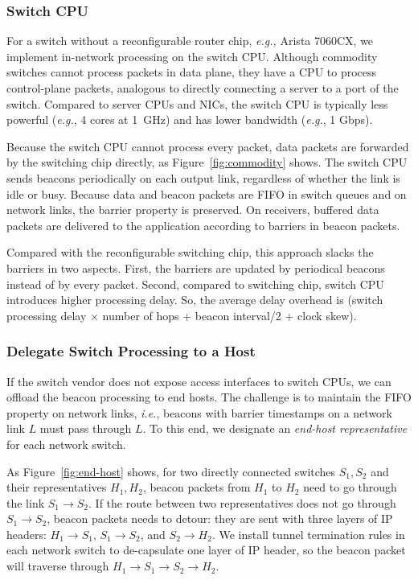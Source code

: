 \subsubsection{Switch CPU}
\label{sec:commodity}

For a switch without a reconfigurable router chip, \textit{e.g.,} Arista 7060CX, we implement in-network processing on the switch CPU.
Although commodity switches cannot process packets in data plane, they have a CPU to process control-plane packets, analogous to directly connecting a server to a port of the switch.
Compared to server CPUs and NICs, the switch CPU is typically less powerful (\textit{e.g.}, 4 cores at 1~GHz) and has lower bandwidth (\textit{e.g.}, 1 Gbps).

Because the switch CPU cannot process every packet, data packets are forwarded by the switching chip directly, as Figure~\ref{fig:commodity} shows.
The switch CPU sends beacons periodically on each output link, regardless of whether the link is idle or busy.
Because data and beacon packets are FIFO in switch queues and on network links, the barrier property is preserved. On receivers, buffered data packets are delivered to the application according to barriers in beacon packets.

Compared with the reconfigurable switching chip, this approach slacks the barriers in two aspects.
First, the barriers are updated by periodical beacons instead of by every packet.
Second, compared to switching chip, switch CPU introduces higher processing delay.
So, the average delay overhead is (switch processing delay $\times$ number of hops + beacon interval/2 + clock skew).

\subsubsection{Delegate Switch Processing to a Host}
\label{sec:end-host}

If the switch vendor does not expose access interfaces to switch CPUs, we can offload the beacon processing to end hosts. The challenge is to maintain the FIFO property on network links, \emph{i.e.}, beacons with barrier timestamps on a network link $L$ must pass through $L$. To this end, we designate an \emph{end-host representative} for each network switch. %

As Figure~\ref{fig:end-host} shows, for two directly connected switches $S_1, S_2$ and their representatives $H_1, H_2$, beacon packets from $H_1$ to $H_2$ need to go through the link $S_1 \rightarrow S_2$. If the route between two representatives does not go through $S_1 \rightarrow S_2$, beacon packets needs to detour: they are sent with three layers of IP headers: $H_1 \rightarrow S_1$, $S_1 \rightarrow S_2$, and $S_2 \rightarrow H_2$.
We install tunnel termination rules in each network switch to de-capsulate one layer of IP header, so the beacon packet will traverse through $H_1 \rightarrow S_1 \rightarrow S_2 \rightarrow H_2$.

